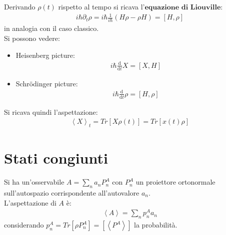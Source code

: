Derivando $\rho(t)$ rispetto al tempo si ricava l'$\textbf{equazione di Liouville}$:
\begin{equation}\begin{split}
i\hbar \partial _t\rho=i\hbar \frac{1}{i\hbar }\left(H\rho -\rho H\right)=\left[H,\rho\right]
\end{split}\end{equation}
in analogia con il caso classico.\\

Si possono vedere:
\begin{itemize}
\item Heisenberg picture:
\begin{equation}\begin{split}
i\hbar \frac{\textrm{d}}{\textrm{d}t}X=\left[X,H\right]
\end{split}\end{equation}
\item Schrödinger picture:
\begin{equation}\begin{split}
i\hbar \frac{\textrm{d}}{\textrm{d}t}\rho=\left[H,\rho\right]
\end{split}\end{equation}
\end{itemize}

Si ricava quindi l'aspettazione:
\begin{equation}\begin{split}
\left\langle X \right\rangle_t=Tr\left[X\rho\left(t\right)\right]=Tr\left[x\left(t\right)\rho\right]
\end{split}\end{equation}

\section{Stati congiunti} %

Si ha un'osservabile $A=\sum_n{a_nP_n^A}$ con $P_n^A$ un proiettore ortonormale sull'autospazio corrispondente all'autovalore $a_n$. \\
L'aspettazione di $A$ è:
\begin{equation}\begin{split}
\left\langle A \right\rangle=\sum_n{p_n^Aa_n}
\end{split}\end{equation}
considerando $p_n^A=Tr\left[\rho P_n^A\right]=\left[\left\langle P^A \right\rangle\right]$ la probabilità.\\

